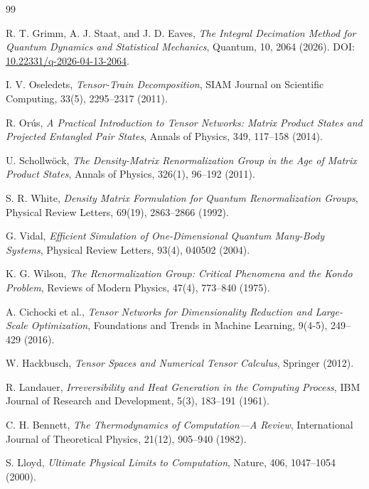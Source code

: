\documentclass[11pt]{article}
\theoremstyle{definition}
\begin{document}
\begin{thebibliography}{99}

R. T. Grimm, A. J. Staat, and J. D. Eaves,
\textit{The Integral Decimation Method for Quantum Dynamics and Statistical Mechanics},
Quantum, 10, 2064 (2026).
DOI: \href{https://doi.org/10.22331/q-2026-04-13-2064}{10.22331/q-2026-04-13-2064}.

I. V. Oseledets,
\textit{Tensor-Train Decomposition},
SIAM Journal on Scientific Computing, 33(5), 2295--2317 (2011).

R. Or\'{u}s,
\textit{A Practical Introduction to Tensor Networks: Matrix Product States
and Projected Entangled Pair States},
Annals of Physics, 349, 117--158 (2014).

U. Schollw\"{o}ck,
\textit{The Density-Matrix Renormalization Group in the Age of Matrix
Product States},
Annals of Physics, 326(1), 96--192 (2011).

S. R. White,
\textit{Density Matrix Formulation for Quantum Renormalization Groups},
Physical Review Letters, 69(19), 2863--2866 (1992).

G. Vidal,
\textit{Efficient Simulation of One-Dimensional Quantum Many-Body Systems},
Physical Review Letters, 93(4), 040502 (2004).

K. G. Wilson,
\textit{The Renormalization Group: Critical Phenomena and the Kondo Problem},
Reviews of Modern Physics, 47(4), 773--840 (1975).

A. Cichocki et al.,
\textit{Tensor Networks for Dimensionality Reduction and Large-Scale
Optimization},
Foundations and Trends in Machine Learning, 9(4-5), 249--429 (2016).

W. Hackbusch,
\textit{Tensor Spaces and Numerical Tensor Calculus},
Springer (2012).

R. Landauer,
\textit{Irreversibility and Heat Generation in the Computing Process},
IBM Journal of Research and Development, 5(3), 183--191 (1961).

C. H. Bennett,
\textit{The Thermodynamics of Computation---A Review},
International Journal of Theoretical Physics, 21(12), 905--940 (1982).

S. Lloyd,
\textit{Ultimate Physical Limits to Computation},
Nature, 406, 1047--1054 (2000).


\end{thebibliography}
\end{document}
